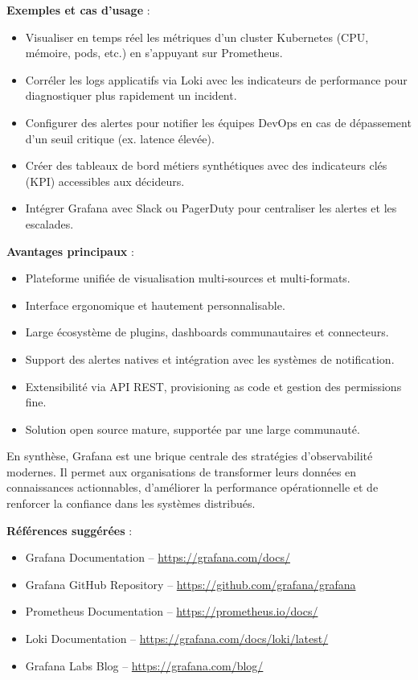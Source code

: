 \textbf{Exemples et cas d’usage} :
\begin{itemize}
	\item Visualiser en temps réel les métriques d’un cluster Kubernetes (CPU, mémoire, pods, etc.) en s’appuyant sur Prometheus.
	\item Corréler les logs applicatifs via Loki avec les indicateurs de performance pour diagnostiquer plus rapidement un incident.
	\item Configurer des alertes pour notifier les équipes DevOps en cas de dépassement d’un seuil critique (ex. latence élevée).
	\item Créer des tableaux de bord métiers synthétiques avec des indicateurs clés (KPI) accessibles aux décideurs.
	\item Intégrer Grafana avec Slack ou PagerDuty pour centraliser les alertes et les escalades.
\end{itemize}

\textbf{Avantages principaux} :
\begin{itemize}
	\item Plateforme unifiée de visualisation multi-sources et multi-formats.
	\item Interface ergonomique et hautement personnalisable.
	\item Large écosystème de plugins, dashboards communautaires et connecteurs.
	\item Support des alertes natives et intégration avec les systèmes de notification.
	\item Extensibilité via API REST, provisioning as code et gestion des permissions fine.
	\item Solution open source mature, supportée par une large communauté.
\end{itemize}

En synthèse, Grafana est une brique centrale des stratégies d’observabilité modernes. Il permet aux organisations de transformer leurs données en connaissances actionnables, d’améliorer la performance opérationnelle et de renforcer la confiance dans les systèmes distribués.

\textbf{Références suggérées} :
\begin{itemize}
	\item Grafana Documentation – \url{https://grafana.com/docs/}
	\item Grafana GitHub Repository – \url{https://github.com/grafana/grafana}
	\item Prometheus Documentation – \url{https://prometheus.io/docs/}
	\item Loki Documentation – \url{https://grafana.com/docs/loki/latest/}
	\item Grafana Labs Blog – \url{https://grafana.com/blog/}
\end{itemize}

